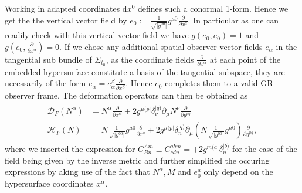 \documentclass[a4paper,12pt, DIV=14, BCOR=5mm, twoside, headsepline]{scrbook}
\begin{document}
Working in adapted coordinates $\mathrm{d}x^0$ defines such a conormal 1-form. Hence we get the the vertical vector field by $e_0 := \frac{1}{\sqrt{\vert g^{00} \vert }} g^{a0} \frac{\partial}{\partial x^a}$.
In particular as one can readily check with this vertical vector field we have $g(e_0,e_0) = 1$ and $g(e_0,\frac{\partial}{\partial x^{\alpha}}) = 0$. If we chose any additional spatial observer vector fields $e_{\alpha}$ in the tangential sub bundle of $\Sigma_{t_0}$, as the coordinate fields $\frac{\partial}{\partial x^{\alpha}}$ at each point of the embedded hypersurface constitute a basis of the tangential subspace, they are necessarily of the form $e_{\alpha} = e_{\alpha}^{\beta} \frac{\partial}{\partial x^{\beta}}$. Hence $e_0$ completes them to a valid GR observer frame.
The deformation operators can then be obtained as
\begin{align}
    \begin{aligned}
    \mathcal{D}_F(N^{\alpha}) &= N^{\alpha} \frac{\partial}{\partial x^{\alpha}} + 2 g^{\mu (p\vert} \delta^{\vert q)}_{\nu} \partial_{\mu} N^{\nu} \frac{\partial}{\partial g ^{pq}} \\
    \mathcal{H}_F(N) &= N \frac{1}{\sqrt{\vert g^{00} \vert }} g^{a0} \frac{\partial}{\partial x^a} +2 g^{\mu (p\vert} \delta^{\vert q)}_{n} \partial_{\mu} \left (N \frac{1}{\sqrt{\vert g^{00} \vert }} g^{n0} \right )  \frac{\partial}{\partial g ^{pq}},
    \end{aligned}
\end{align}
where we inserted the expression for $C^{Am}_{Bn} \equiv C^{abm}_{cdn} = +2g^{m(a\vert}\delta^{\vert b)}_n$ for the case of the field being given by the inverse metric and further simplified the occuring expressions by aking use of the fact that $N^{\alpha},M$ and $e_0^a$ only depend on the hypersurface coordinates $x^\alpha$.
\end{document}
